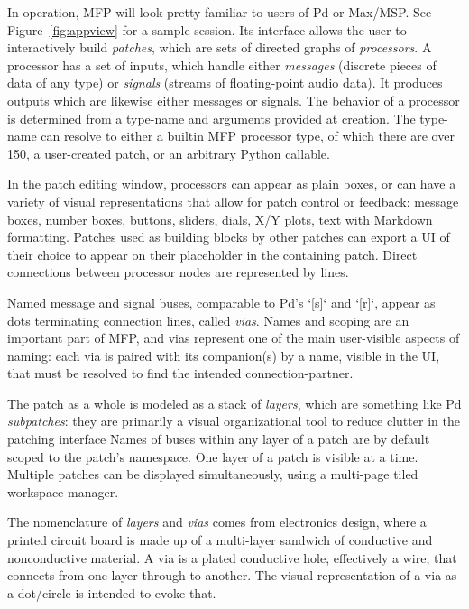 \documentclass[a4paper]{article}
\begin{document}
In operation, MFP will look pretty familiar to users of Pd or
Max/MSP. See Figure~\ref{fig:appview} for a sample session. Its
interface allows the user to interactively build {\it patches},
which are sets of directed graphs of {\it processors}. A
processor has a set of inputs, which handle either {\it messages}
(discrete pieces of data of any type) or {\it signals} (streams
of floating-point audio data). It produces outputs which are
likewise either messages or signals. The behavior of a processor
is determined from a type-name and arguments provided at
creation. The type-name can resolve to either a builtin MFP
processor type, of which there are over 150, a user-created
patch, or an arbitrary Python callable.

In the patch editing window, processors can appear as plain
boxes, or can have a variety of visual representations that allow
for patch control or feedback: message boxes, number boxes,
buttons, sliders, dials, X/Y plots, text with Markdown
formatting. Patches used as building blocks by other patches can
export a UI of their choice to appear on their placeholder in the
containing patch. Direct connections between processor nodes are
represented by lines.

Named message and signal buses, comparable to Pd's `[s]` and
`[r]`, appear as dots terminating connection lines, called {\it
vias}. Names and scoping are an important part of MFP, and vias
represent one of the main user-visible aspects of naming: each
via is paired with its companion(s) by a name, visible in the UI,
that must be resolved to find the intended connection-partner.

The patch as a whole is modeled as a stack of {\it layers}, which are
something like Pd {\it subpatches}: they are primarily a visual
organizational tool to reduce clutter in the patching interface
Names of buses within any layer of a patch are by default scoped
to the patch's namespace. One layer of a patch is visible at a
time. Multiple patches can be displayed simultaneously, using a
multi-page tiled workspace manager.

The nomenclature of {\it layers} and {\it vias} comes from electronics
design, where a printed circuit board is made up of a multi-layer
sandwich of conductive and nonconductive material. A via is a
plated conductive hole, effectively a wire, that connects from
one layer through to another. The visual representation of a via
as a dot/circle is intended to evoke that.
\end{document}
